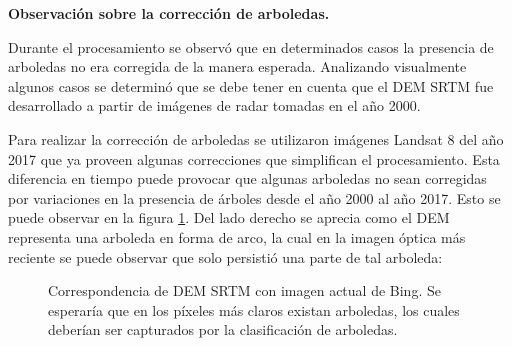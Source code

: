 \documentclass[10pt,a4paper, twoside]{report}
\begin{document}
\textbf{Observación sobre la corrección de arboledas.}
\label{obscorreccionArboledas}

Durante el procesamiento se observó que en determinados casos la presencia de arboledas no era corregida de la manera esperada. Analizando visualmente algunos casos se determinó que se debe tener en cuenta que el DEM SRTM fue desarrollado a partir de imágenes de radar tomadas en el año 2000.

Para realizar la corrección de arboledas se utilizaron imágenes Landsat 8 del año 2017 que ya proveen algunas correcciones que simplifican el procesamiento. Esta diferencia en tiempo puede provocar que algunas arboledas no sean corregidas por variaciones en la presencia de árboles desde el año 2000 al año 2017. Esto se puede observar en la figura \ref{fig:observacionArboledas}. Del lado derecho se aprecia como el DEM representa una arboleda en forma de arco, la cual en la imagen óptica más reciente se puede observar que solo persistió una parte de tal arboleda:

\begin{figure}[H]
	\centering
	\caption{Correspondencia de DEM SRTM con imagen actual de Bing. Se esperaría que en los píxeles más claros existan arboledas, los cuales deberían ser capturados por la clasificación de arboledas.} 
	\label{fig:observacionArboledas}
\end{figure}
\end{document}
